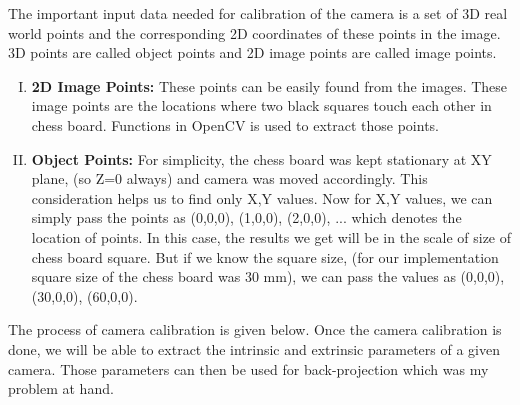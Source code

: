 \documentclass[a4paper,12pt]{report}%
\begin{document}
The important input data needed for calibration of the camera is a set of 3D real world points and the corresponding 2D coordinates of these points in the image. 3D points are called object points and 2D image points are called image points.

\begin{enumerate}[I.]
	\item \textbf{2D Image Points:} These points can be easily found from the images. These image points are the locations where two black squares touch each other in chess board. Functions in OpenCV is used to extract those points\cite{cam_calib:_nodate}.
	
	\item \textbf{Object Points:}  For simplicity, the chess board was kept stationary at XY plane, (so Z=0 always) and camera was moved accordingly. This consideration helps us to find only X,Y values. Now for X,Y values, we can simply pass the points as (0,0,0), (1,0,0), (2,0,0), ... which denotes the location of points. In this case, the results we get will be in the scale of size of chess board square\cite{cam_calib:_nodate}. But if we know the square size, (for our implementation square size of the chess board was 30 mm), we can pass the values as (0,0,0), (30,0,0), (60,0,0).
\end{enumerate}

The process of camera calibration is given below. Once the camera calibration is done, we will be able to extract the intrinsic and extrinsic parameters of a given camera. Those parameters can then be used for back-projection which was my problem at hand.\\
\end{document}

